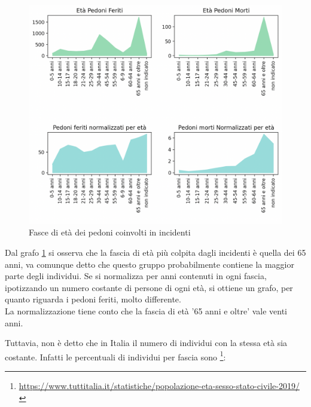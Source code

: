 \documentclass[a4paper]{report}
\begin{document}
\begin{figure}
    \includegraphics[width=\linewidth]{../src/incidenti/incidenti_senza_coords/pedoni/eta_pedoni.png}
    \caption{Fasce di età dei pedoni coinvolti in incidenti}
    \label{fig:eta-pedoni}
\end{figure}

Dal grafo \ref{fig:eta-pedoni} si osserva che la fascia di età più colpita dagli 
incidenti è quella dei 65 anni, va comunque detto che questo gruppo probabilmente 
contiene la maggior parte degli individui.
Se si normalizza per anni contenuti in ogni fascia, ipotizzando un numero
costante di persone di ogni età, si ottiene un grafo, per quanto riguarda i pedoni 
feriti, molto differente. \\
La normalizzazione tiene conto che la fascia di età '65 anni e oltre' vale venti anni.

Tuttavia, non è detto che in Italia il numero di individui con la stessa età sia costante.
Infatti le percentuali di individui per fascia sono
\footnote{\url{https://www.tuttitalia.it/statistiche/popolazione-eta-sesso-stato-civile-2019/}}: 
\end{document}

